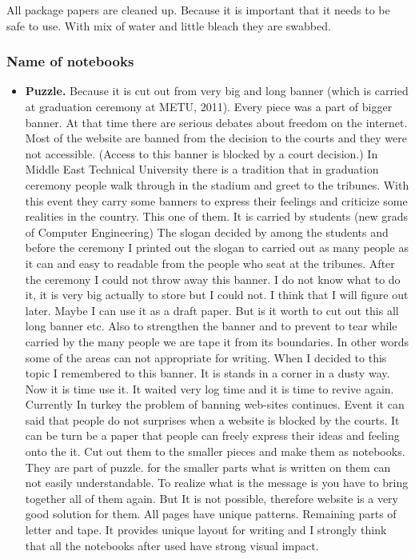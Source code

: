 All package papers are cleaned up. Because it is important that it needs to be safe to use. With mix of water and little bleach they are swabbed. 

\subsubsection{Name of notebooks}
\begin{itemize}
\item \textbf{Puzzle.} Because it is cut out from very big and long banner (which is carried at graduation ceremony at METU, 2011). Every piece was a part of bigger banner. At that time there are serious debates about freedom on the internet. Most of the website are banned from the decision to the courts and they were not accessible. (Access to this banner is blocked by a court decision.) In Middle East Technical University there is a tradition that in graduation ceremony people walk through in the stadium and greet to the tribunes. With this event they carry some banners to express their feelings and criticize some realities in the country. This one of them. It is carried by students (new grads of Computer Engineering) The slogan decided by among the students and before the ceremony I printed out the slogan to carried out as many people as it can and easy to readable from the people who seat at the tribunes. After the ceremony I could not throw away this banner. I do not know what to do it, it is very big actually to store but I could not. I think that I will figure out later. Maybe I can use it as a draft paper. But is it worth to cut out this all long banner etc. Also to strengthen the banner and to prevent to tear while carried by the many people we are tape it from its boundaries. In other words some of the areas can not appropriate for writing. When I decided to this topic I remembered to this banner. It is stands in a corner in a dusty way. Now it is time use it. It waited very log time and it is time to revive again. Currently In turkey the problem of banning web-sites continues. Event it can said that people do not surprises when a website is blocked by the courts. It can be turn be a paper that people can freely express their ideas and feeling onto the it. Cut out them to the smaller pieces and make them as notebooks. They are part of puzzle. for the smaller parts what is written on them can not easily understandable. To realize what is the message is you have to bring together all of them again. But It is not possible, therefore website is a very good solution for them. All pages have unique patterns. Remaining parts of letter and tape. It provides unique layout for writing and I strongly think that all the notebooks after used have strong visual impact. 

\end{itemize}
